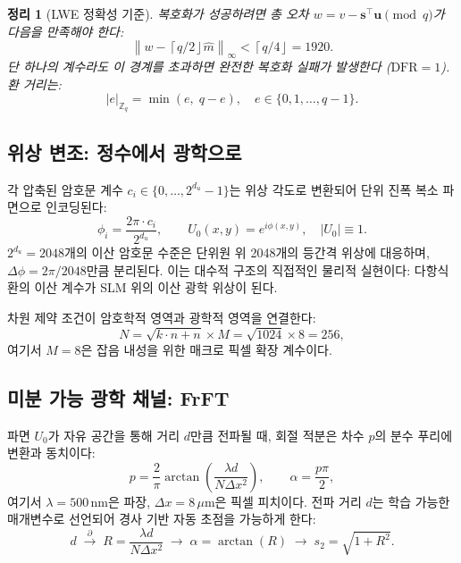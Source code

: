 \documentclass[11pt, a4paper]{article}
\theoremstyle{definition}
\theoremstyle{plain}
\newtheorem{theorem}{정리}[section]
\newcommand{\Zq}{\mathbb{Z}_q}
\newcommand{\norm}[1]{\left\|#1\right\|}
\newcommand{\ceil}[1]{\left\lceil#1\right\rfloor}
\begin{document}
\begin{theorem}[LWE 정확성 기준]
\label{thm:lwe}
복호화가 성공하려면 총 오차 $w = v - \mathbf{s}^\top\mathbf{u} \pmod{q}$가 다음을 만족해야 한다:
\begin{equation}
  \norm{w - \ceil{q/2}\hat{m}}_\infty < \ceil{q/4} = 1920.
  \label{eq:lwe_threshold}
\end{equation}
단 하나의 계수라도 이 경계를 초과하면 완전한 복호화 실패가 발생한다 ($\mathrm{DFR} = 1$). 환 거리는:
\begin{equation}
  |e|_{\Zq} = \min(e, \; q - e), \quad e \in \{0, 1, \ldots, q-1\}.
  \label{eq:ring_distance}
\end{equation}
\end{theorem}


\subsection{위상 변조: 정수에서 광학으로}
\label{sec:phase_mod}

각 압축된 암호문 계수 $c_i \in \{0, \ldots, 2^{d_u}-1\}$는 위상 각도로 변환되어 단위 진폭 복소 파면으로 인코딩된다:
\begin{equation}
  \phi_i = \frac{2\pi \cdot c_i}{2^{d_u}}, \qquad
  U_0(x,y) = e^{i\phi(x,y)}, \quad |U_0| \equiv 1.
  \label{eq:phase_mod}
\end{equation}
$2^{d_u} = 2048$개의 이산 암호문 수준은 단위원 위 2048개의 등간격 위상에 대응하며, $\Delta\phi = 2\pi/2048$만큼 분리된다. 이는 대수적 구조의 직접적인 물리적 실현이다: 다항식환의 이산 계수가 SLM 위의 이산 광학 위상이 된다.

차원 제약 조건이 암호학적 영역과 광학적 영역을 연결한다:
\begin{equation}
  N = \sqrt{k \cdot n + n} \times M = \sqrt{1024} \times 8 = 256,
  \label{eq:dim_constraint}
\end{equation}
여기서 $M = 8$은 잡음 내성을 위한 매크로 픽셀 확장 계수이다.


\subsection{미분 가능 광학 채널: FrFT}
\label{sec:frft}

파면 $U_0$가 자유 공간을 통해 거리 $d$만큼 전파될 때, 회절 적분은 차수 $p$의 분수 푸리에 변환과 동치이다:
\begin{equation}
  p = \frac{2}{\pi}\arctan\!\left(\frac{\lambda d}{N \Delta x^2}\right),
  \qquad \alpha = \frac{p\pi}{2},
  \label{eq:frft_order}
\end{equation}
여기서 $\lambda = 500\,$nm은 파장, $\Delta x = 8\,\mu$m은 픽셀 피치이다. 전파 거리 $d$는 학습 가능한 매개변수로 선언되어 경사 기반 자동 초점을 가능하게 한다:
\begin{equation}
  d \;\xrightarrow{\;\partial\;}\;
  R = \frac{\lambda d}{N\Delta x^2} \;\to\;
  \alpha = \arctan(R) \;\to\;
  s_2 = \sqrt{1 + R^2}.
  \label{eq:learnable_d}
\end{equation}
\end{document}
